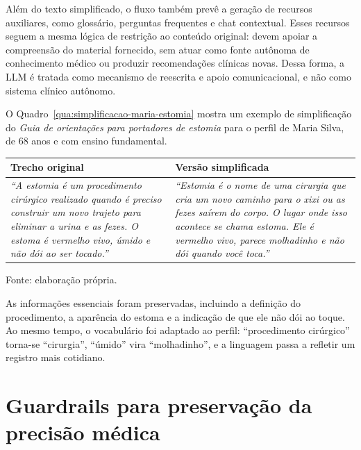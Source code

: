 Além do texto simplificado, o fluxo também prevê a geração de recursos auxiliares, como glossário, perguntas frequentes e chat contextual. Esses recursos seguem a mesma lógica de restrição ao conteúdo original: devem apoiar a compreensão do material fornecido, sem atuar como fonte autônoma de conhecimento médico ou produzir recomendações clínicas novas. Dessa forma, a LLM é tratada como mecanismo de reescrita e apoio comunicacional, e não como sistema clínico autônomo.

O Quadro~\ref{qua:simplificacao-maria-estomia} mostra um exemplo de simplificação do \textit{Guia de orientações para portadores de estomia} para o perfil de Maria Silva, de 68 anos e com ensino fundamental.

\begin{quadro}[htbp]
  \centering
  \caption{Exemplo de simplificação adaptada ao perfil Maria.}
  \label{qua:simplificacao-maria-estomia}
  \small
  \renewcommand{\arraystretch}{1.2}

  \begin{tabularx}{\textwidth}{p{} X}
    \toprule
    \textbf{Trecho original} & \textbf{Versão simplificada} \\
    \midrule

    \textit{``A estomia é um procedimento cirúrgico realizado quando é preciso construir um novo trajeto para eliminar a urina e as fezes. O estoma é vermelho vivo, úmido e não dói ao ser tocado.''}
    &
    \textit{``Estomia é o nome de uma cirurgia que cria um novo caminho para o xixi ou as fezes saírem do corpo. O lugar onde isso acontece se chama estoma. Ele é vermelho vivo, parece molhadinho e não dói quando você toca.''} \\

    \bottomrule
  \end{tabularx}

  \vspace{0.3em}
  {\small Fonte: elaboração própria.}
\end{quadro}

As informações essenciais foram preservadas, incluindo a definição do procedimento, a aparência do estoma e a indicação de que ele não dói ao toque. Ao mesmo tempo, o vocabulário foi adaptado ao perfil: ``procedimento cirúrgico'' torna-se ``cirurgia'', ``úmido'' vira ``molhadinho'', e a linguagem passa a refletir um registro mais cotidiano.

\section{Guardrails para preservação da precisão médica} 
\label{sec:guardrails-preservacao-precisao-medica} 


